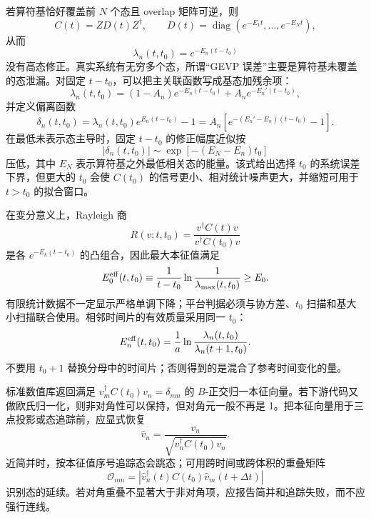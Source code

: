 若算符基恰好覆盖前 \(N\) 个态且 overlap 矩阵可逆，则
\begin{equation}
  C(t)=ZD(t)Z^\dagger,
  \qquad
  D(t)=\operatorname{diag}(e^{-E_1t},\dots,e^{-E_Nt}),
  \label{eq:b02-z-factorization}
\end{equation}
从而
\begin{equation}
  \lambda_n(t,t_0)=e^{-E_n(t-t_0)}
  \label{eq:b02-gevp-exact}
\end{equation}
没有高态修正。真实系统有无穷多个态，所谓“GEVP 误差”主要是算符基未覆盖的态泄漏。对固定 \(t-t_0\)，可以把主关联函数写成基态加残余项：
\begin{equation}
  \lambda_n(t,t_0)
  =(1-A_n)e^{-E_n(t-t_0)}
  +A_ne^{-E_n'(t-t_0)},
  \label{eq:b02-principal}
\end{equation}
并定义偏离函数
\begin{equation}
  \delta_n(t,t_0)
  =\lambda_n(t,t_0)e^{E_n(t-t_0)}-1
  =A_n\left[e^{-(E_n'-E_n)(t-t_0)}-1\right].
  \label{eq:b02-departure}
\end{equation}
在最低未表示态主导时，固定 \(t-t_0\) 的修正幅度近似按
\begin{equation}
  |\delta_n(t,t_0)|
  \sim
  \exp\!\left[-(E_N-E_n)t_0\right]
  \label{eq:b02-t0-suppression}
\end{equation}
压低，其中 \(E_N\) 表示算符基之外最低相关态的能量。该式给出选择 \(t_0\) 的系统误差下界，但更大的 \(t_0\) 会使 \(C(t_0)\) 的信号更小、相对统计噪声更大，并缩短可用于 \(t>t_0\) 的拟合窗口。

在变分意义上，Rayleigh 商
\begin{equation}
  R(v;t,t_0)
  =\frac{v^\dagger C(t)v}{v^\dagger C(t_0)v}
  \label{eq:b02-rayleigh}
\end{equation}
是各 \(e^{-E_k(t-t_0)}\) 的凸组合，因此最大本征值满足
\begin{equation}
  E_0^{\rm eff}(t,t_0)
  \equiv\frac1{t-t_0}\ln\frac1{\lambda_{\max}(t,t_0)}
  \ge E_0.
  \label{eq:b02-variational-bound}
\end{equation}
有限统计数据不一定显示严格单调下降；平台判据必须与协方差、\(t_0\) 扫描和基大小扫描联合使用。相邻时间片的有效质量采用同一 \(t_0\)：
\begin{equation}
  E_n^{\rm eff}(t,t_0)
  =\frac1a\ln
  \frac{\lambda_n(t,t_0)}{\lambda_n(t+1,t_0)}.
  \label{eq:b02-gevp-meff}
\end{equation}
不要用 \(t_0+1\) 替换分母中的时间片；否则得到的是混合了参考时间变化的量。

标准数值库返回满足 \(v_m^\dagger C(t_0)v_n=\delta_{mn}\) 的 \(B\)-正交归一本征向量。若下游代码又做欧氏归一化，则非对角性可以保持，但对角元一般不再是 1。把本征向量用于三点投影或态追踪前，应显式恢复
\begin{equation}
  \widehat v_n
  =\frac{v_n}{\sqrt{v_n^\dagger C(t_0)v_n}}.
  \label{eq:b02-b-normalization}
\end{equation}
近简并时，按本征值序号追踪态会跳态；可用跨时间或跨体积的重叠矩阵
\begin{equation}
  \mathcal O_{nm}
  =\left|\widehat v_n^\dagger(t)C(t_0)\widehat v_m(t+\Delta t)\right|
  \label{eq:b02-state-tracking}
\end{equation}
识别态的延续。若对角重叠不显著大于非对角项，应报告简并和追踪失败，而不应强行连线。

